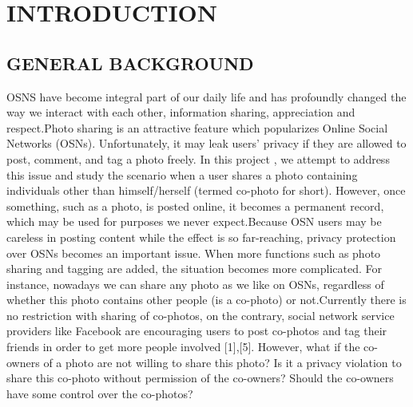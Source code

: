 %
\chapter[INTRODUCTION]{\fontsize{16}{12}\selectfont INTRODUCTION}


\section[General Background]{\fontsize{14}{12}\selectfont \MakeUppercase{GENERAL BACKGROUND}}
OSNS have become integral part of our daily life and has profoundly changed the way we interact with each other, information sharing, appreciation and respect.Photo sharing is an attractive feature which popularizes Online Social Networks (OSNs). Unfortunately, it may leak users’ privacy if they are allowed to post, comment, and tag a photo freely. In this project , we attempt to address this issue and study the scenario when a user shares a photo containing individuals other than himself/herself (termed co-photo for short). However, once something, such as a photo, is posted online, it becomes a permanent record, which may be used for purposes we never expect.Because OSN users may be careless in posting content while the effect is so far-reaching, privacy protection over OSNs becomes an important issue. When more functions such as photo sharing and tagging are added, the situation becomes more complicated. For instance, nowadays we can share any photo as we like on OSNs, regardless of whether this photo contains other people (is a co-photo) or not.Currently there is no restriction with sharing of co-photos, on the contrary, social network service providers like Facebook are encouraging users to post co-photos and tag their friends in order to get more people involved [1],[5]. However, what if the co-owners of a photo are not willing to share this photo? Is it a privacy violation to share this co-photo without permission of the co-owners? Should the co-owners have some control over the co-photos?
 
